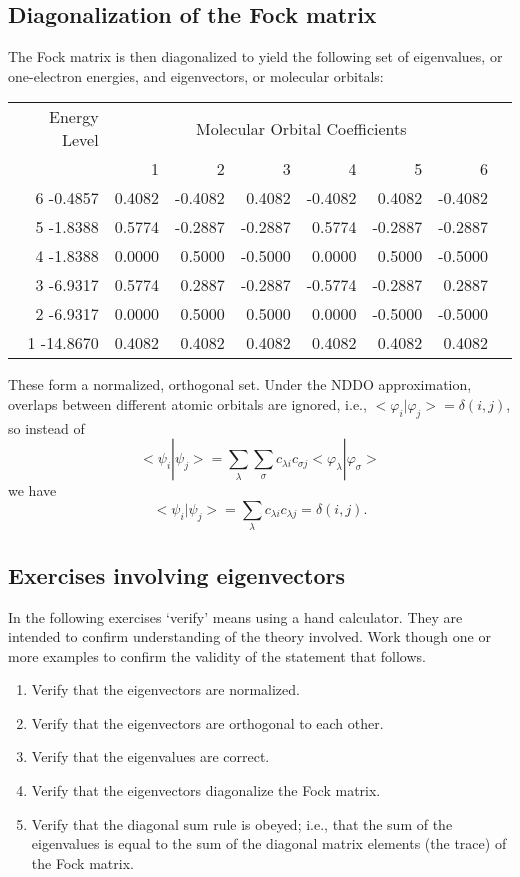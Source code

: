 \subsection{Diagonalization of the Fock matrix}\label{mo}
The Fock matrix is then diagonalized to yield the
following set of eigenvalues, or one-electron energies,  and eigenvectors, or
molecular orbitals:
\begin{center}
\begin{tabular}{rrrrrrrr} \hline
Energy Level & \multicolumn{6}{c}{Molecular Orbital Coefficients} \\ \cline{2-7}
            & 1 & 2 & 3 & 4 & 5 & 6 \\ \hline
6 -0.4857  &0.4082& -0.4082&  0.4082& -0.4082&  0.4082& -0.4082  \\
5 -1.8388  &0.5774& -0.2887& -0.2887&  0.5774& -0.2887& -0.2887  \\
4 -1.8388  &0.0000&  0.5000& -0.5000&  0.0000&  0.5000& -0.5000  \\
3 -6.9317  &0.5774&  0.2887& -0.2887& -0.5774& -0.2887&  0.2887  \\
2 -6.9317  &0.0000&  0.5000&  0.5000&  0.0000& -0.5000& -0.5000  \\
1 -14.8670 &0.4082&  0.4082&  0.4082&  0.4082&  0.4082&  0.4082  \\ \hline
\end{tabular}
\end{center}
These form a normalized, orthogonal set. Under the NDDO approximation,
overlaps between different atomic orbitals are ignored, i.e.,
$<\varphi_i|\varphi_j>=\delta(i,j)$, so instead of
$$
<\psi_i|\psi_j> = \sum_{\lambda}\sum_{\sigma}c_{\lambda i}c_{\sigma j}<\varphi_{\lambda}|\varphi_{\sigma}>
$$
we have
$$
<\psi_i|\psi_j> = \sum_{\lambda}c_{\lambda i}c_{\lambda j} = \delta(i,j).
$$

\subsection{Exercises involving eigenvectors}
In the following exercises `verify' means using a hand calculator. They are
intended to confirm understanding of the theory involved. Work though one or
more examples to confirm the validity of the statement that follows.
\begin{enumerate}
\item Verify that the eigenvectors are normalized.
\item Verify that the eigenvectors are orthogonal to each other.
\item Verify that the eigenvalues are correct.
\item Verify that the eigenvectors diagonalize the Fock matrix.
\item Verify that the diagonal sum rule is obeyed; i.e., that the sum of the
eigenvalues is equal to the sum of the diagonal matrix elements (the trace) of
the Fock matrix.
\end{enumerate}


